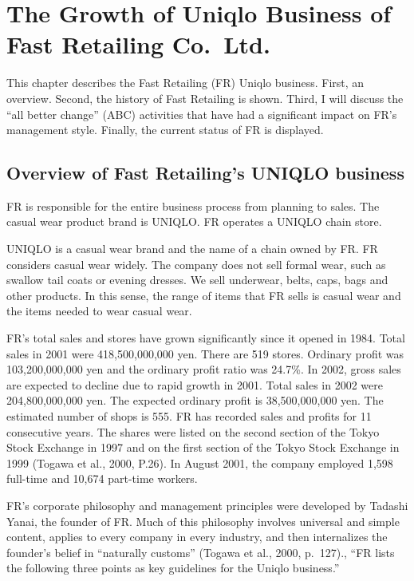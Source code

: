 \documentclass[12pt,]{article}
\begin{document}
\hypertarget{the-growth-of-uniqlo-business-of-fast-retailing-co.ltd.}{%
\section{The Growth of Uniqlo Business of Fast Retailing
Co.~Ltd.}\label{the-growth-of-uniqlo-business-of-fast-retailing-co.ltd.}}

This chapter describes the Fast Retailing (FR) Uniqlo business. First,
an overview. Second, the history of Fast Retailing is shown. Third, I
will discuss the ``all better change'' (ABC) activities that have had a
significant impact on FR's management style. Finally, the current status
of FR is displayed.

\hypertarget{overview-of-fast-retailings-uniqlo-business}{%
\subsection{Overview of Fast Retailing's UNIQLO
business}\label{overview-of-fast-retailings-uniqlo-business}}

FR is responsible for the entire business process from planning to
sales. The casual wear product brand is UNIQLO. FR operates a UNIQLO
chain store.

UNIQLO is a casual wear brand and the name of a chain owned by FR. FR
considers casual wear widely. The company does not sell formal wear,
such as swallow tail coats or evening dresses. We sell underwear, belts,
caps, bags and other products. In this sense, the range of items that FR
sells is casual wear and the items needed to wear casual wear.

FR's total sales and stores have grown significantly since it opened in
1984. Total sales in 2001 were 418,500,000,000 yen. There are 519
stores. Ordinary profit was 103,200,000,000 yen and the ordinary profit
ratio was 24.7\%. In 2002, gross sales are expected to decline due to
rapid growth in 2001. Total sales in 2002 were 204,800,000,000 yen. The
expected ordinary profit is 38,500,000,000 yen. The estimated number of
shops is 555. FR has recorded sales and profits for 11 consecutive
years. The shares were listed on the second section of the Tokyo Stock
Exchange in 1997 and on the first section of the Tokyo Stock Exchange in
1999 (Togawa et al., 2000, P.26). In August 2001, the company employed
1,598 full-time and 10,674 part-time workers.

FR's corporate philosophy and management principles were developed by
Tadashi Yanai, the founder of FR. Much of this philosophy involves
universal and simple content, applies to every company in every
industry, and then internalizes the founder's belief in ``naturally
customs'' (Togawa et al., 2000, p.~127)., ``FR lists the following three
points as key guidelines for the Uniqlo business.''
\end{document}
